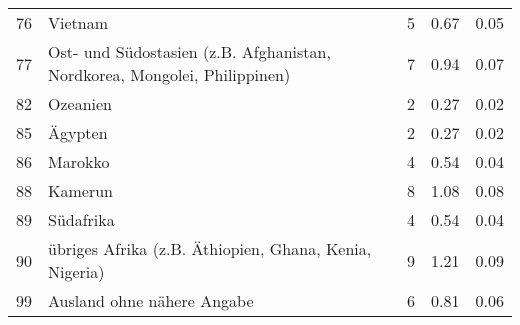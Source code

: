 \begin{longtable}{lXrrr}
        76 & \multicolumn{1}{X}{Vietnam} & %
          \num{5} &
          \num[round-mode=places,round-precision=2]{0,67} &
          \num[round-mode=places,round-precision=2]{0,05} \\

        77 & \multicolumn{1}{X}{Ost- und Südostasien (z.B. Afghanistan, Nordkorea, Mongolei, Philippinen)} & %
          \num{7} &
          \num[round-mode=places,round-precision=2]{0,94} &
          \num[round-mode=places,round-precision=2]{0,07} \\

        82 & \multicolumn{1}{X}{Ozeanien} & %
          \num{2} &
          \num[round-mode=places,round-precision=2]{0,27} &
          \num[round-mode=places,round-precision=2]{0,02} \\

        85 & \multicolumn{1}{X}{Ägypten} & %
          \num{2} &
          \num[round-mode=places,round-precision=2]{0,27} &
          \num[round-mode=places,round-precision=2]{0,02} \\

        86 & \multicolumn{1}{X}{Marokko} & %
          \num{4} &
          \num[round-mode=places,round-precision=2]{0,54} &
          \num[round-mode=places,round-precision=2]{0,04} \\

        88 & \multicolumn{1}{X}{Kamerun} & %
          \num{8} &
          \num[round-mode=places,round-precision=2]{1,08} &
          \num[round-mode=places,round-precision=2]{0,08} \\

        89 & \multicolumn{1}{X}{Südafrika} & %
          \num{4} &
          \num[round-mode=places,round-precision=2]{0,54} &
          \num[round-mode=places,round-precision=2]{0,04} \\

        90 & \multicolumn{1}{X}{übriges Afrika (z.B. Äthiopien, Ghana, Kenia, Nigeria)} & %
          \num{9} &
          \num[round-mode=places,round-precision=2]{1,21} &
          \num[round-mode=places,round-precision=2]{0,09} \\

        99 & \multicolumn{1}{X}{Ausland ohne nähere Angabe} & %
          \num{6} &
          \num[round-mode=places,round-precision=2]{0,81} &
          \num[round-mode=places,round-precision=2]{0,06} \\


\end{longtable}
